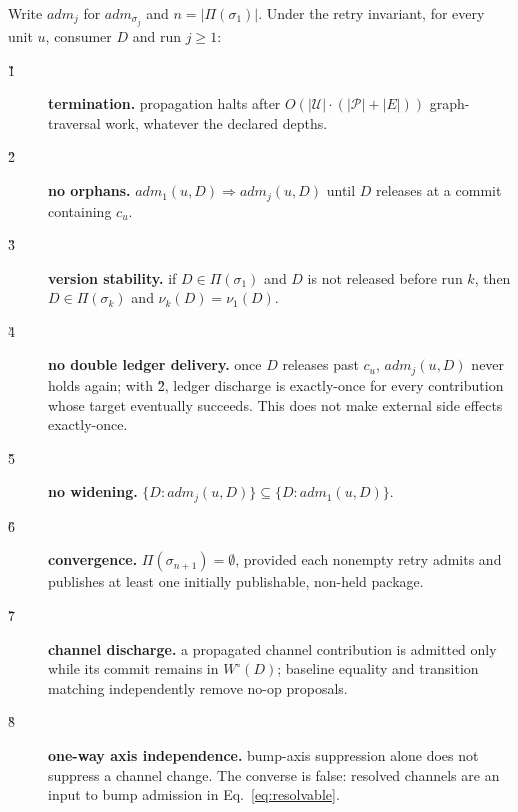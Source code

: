 \begin{theorem}
\label{thm:g}
Write $\mathit{adm}_j$ for $\mathit{adm}_{\sigma_j}$ and $n =
|\Pi(\sigma_1)|$. Under the retry invariant, for every unit $u$, consumer
$D$ and run $j \geq 1$:
\begin{description}
  \item[\G{1}] \textbf{termination.} propagation halts after $O(|\mathcal{U}|
    \cdot (|\mathcal{P}|{+}|E|))$ graph-traversal work, whatever the declared depths.
  \item[\G{2}] \textbf{no orphans.} $\mathit{adm}_1(u,D) \Rightarrow
    \mathit{adm}_j(u,D)$ until $D$ releases at a commit containing
    $c_u$.
  \item[\G{3}] \textbf{version stability.} if $D \in \Pi(\sigma_1)$ and $D$ is not
    released before run $k$, then $D \in \Pi(\sigma_k)$ and $\nu_k(D) =
    \nu_1(D)$.
  \item[\G{4}] \textbf{no double ledger delivery.} once $D$ releases past $c_u$,
    $\mathit{adm}_j(u,D)$ never holds again; with \G{2}, ledger discharge is
    exactly-once for every contribution whose target eventually succeeds.
    This does not make external side effects exactly-once.
  \item[\G{5}] \textbf{no widening.} $\{D : \mathit{adm}_j(u,D)\} \subseteq
    \{D : \mathit{adm}_1(u,D)\}$.
  \item[\G{6}] \textbf{convergence.} $\Pi(\sigma_{n+1}) = \emptyset$, provided
    each nonempty retry admits and publishes at least one initially
    publishable, non-held package.
  \item[\G{7}] \textbf{channel discharge.} a propagated channel contribution is
    admitted only while its commit remains in $W^\circ(D)$; baseline
    equality and transition matching independently remove no-op proposals.
  \item[\G{8}] \textbf{one-way axis independence.} bump-axis suppression alone
    does not suppress a channel change. The converse is false: resolved channels
    are an input to bump admission in Eq.~\ref{eq:resolvable}.
\end{description}
\end{theorem}

